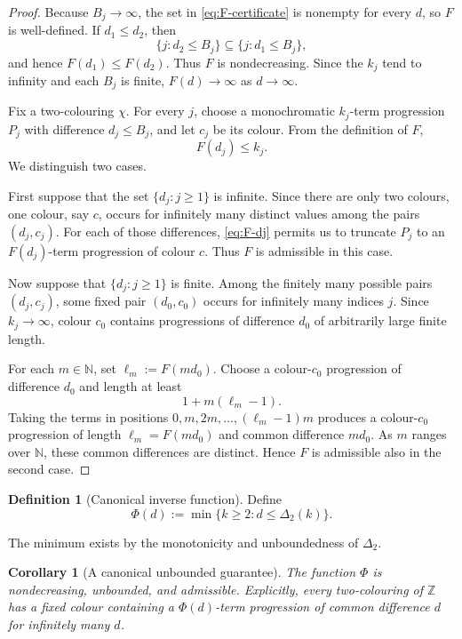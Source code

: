 \documentclass[11pt]{article}
\newtheorem{corollary}[theorem]{Corollary}
\theoremstyle{definition}
\newtheorem{definition}[theorem]{Definition}
\theoremstyle{remark}
\newcommand{\N}{\mathbb N}
\newcommand{\Z}{\mathbb Z}
\newcommand{\DeltaTwo}{\Delta_{2}}
\newcommand{\PhiTwo}{\Phi}
\newcommand{\col}{\chi}
\begin{document}
\begin{proof}
Because $B_j\to\infty$, the set in \eqref{eq:F-certificate} is nonempty for every $d$, so $F$ is well-defined. If $d_1\le d_2$, then
\[
\{j:d_2\le B_j\}\subseteq\{j:d_1\le B_j\},
\]
and hence $F(d_1)\le F(d_2)$. Thus $F$ is nondecreasing. Since the $k_j$ tend to infinity and each $B_j$ is finite, $F(d)\to\infty$ as $d\to\infty$.

Fix a two-colouring $\col$. For every $j$, choose a monochromatic $k_j$-term progression $P_j$ with difference $d_j\le B_j$, and let $c_j$ be its colour. From the definition of $F$,
\begin{equation}\label{eq:F-dj}
F(d_j)\le k_j.
\end{equation}
We distinguish two cases.

First suppose that the set $\{d_j:j\ge1\}$ is infinite. Since there are only two colours, one colour, say $c$, occurs for infinitely many distinct values among the pairs $(d_j,c_j)$. For each of those differences, \eqref{eq:F-dj} permits us to truncate $P_j$ to an $F(d_j)$-term progression of colour $c$. Thus $F$ is admissible in this case.

Now suppose that $\{d_j:j\ge1\}$ is finite. Among the finitely many possible pairs $(d_j,c_j)$, some fixed pair $(d_0,c_0)$ occurs for infinitely many indices $j$. Since $k_j\to\infty$, colour $c_0$ contains progressions of difference $d_0$ of arbitrarily large finite length.

For each $m\in\N$, set $\ell_m:=F(md_0)$. Choose a colour-$c_0$ progression of difference $d_0$ and length at least
\[
1+m(\ell_m-1).
\]
Taking the terms in positions $0,m,2m,\ldots,(\ell_m-1)m$ produces a colour-$c_0$ progression of length $\ell_m=F(md_0)$ and common difference $md_0$. As $m$ ranges over $\N$, these common differences are distinct. Hence $F$ is admissible also in the second case.
\end{proof}

\begin{definition}[Canonical inverse function]\label{def:phi}
Define
\begin{equation}\label{eq:phi-def}
\PhiTwo(d):=\min\{k\ge2:d\le\DeltaTwo(k)\}.
\end{equation}
\end{definition}

The minimum exists by the monotonicity and unboundedness of $\DeltaTwo$.

\begin{corollary}[A canonical unbounded guarantee]\label{cor:phi-admissible}
The function $\PhiTwo$ is nondecreasing, unbounded, and admissible. Explicitly, every two-colouring of $\Z$ has a fixed colour containing a $\PhiTwo(d)$-term progression of common difference $d$ for infinitely many $d$.
\end{corollary}
\end{document}
